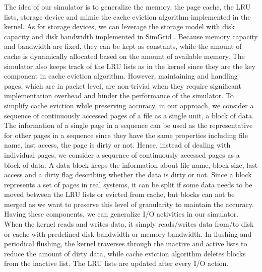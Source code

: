 \documentclass[conference]{IEEEtran}
\begin{document}
			The idea of our simulator is to generalize the memory, the page cache, the LRU lists, storage device and mimic the cache eviction algorithm implemented in the kernel. As for storage devices, we can leverage the storage model with disk capacity and disk bandwidth implemented in SimGrid \cite{lebre2015}. Because memory capacity and bandwidth are fixed, they can be kept as constants, while the amount of cache is dynamically allocated based on the amount of available memory. The simulator also keeps track of the LRU lists as in the kernel since they are the key component in cache eviction algorithm. However, maintaining and handling pages, which are in packet level, are non-trivial when they require significant implementation overhead and hinder the performance of the simulator. To simplify cache eviction while preserving accuracy, in our approach, we consider a sequence of continuously accessed pages of a file as a single unit, a block of data. The information of a single page in a sequence can be used as the representative for other pages in a sequence since they have the same properties including file name, last access, the page is dirty or not. Hence, instead of dealing with individual pages, we consider a sequence of continuously accessed pages as a block of data. A data block keeps the information about file name, block size, last access and a dirty flag describing whether the data is dirty or not. Since a block represents a set of pages in real systems, it can be split if some data needs to be moved between the LRU lists or evicted from cache, but blocks can not be merged as we want to preserve this level of granularity to maintain the accuracy. Having these components, we can generalize I/O activities in our simulator. When the kernel reads and writes data, it simply reads/writes data from/to disk or cache with predefined disk bandwidth or memory bandwidth. In flushing and periodical flushing, the kernel traverses through the inactive and active lists to reduce the amount of dirty data, while cache eviction algorithm deletes blocks from the inactive list. The LRU lists are updated after every I/O action.
			
\end{document}
